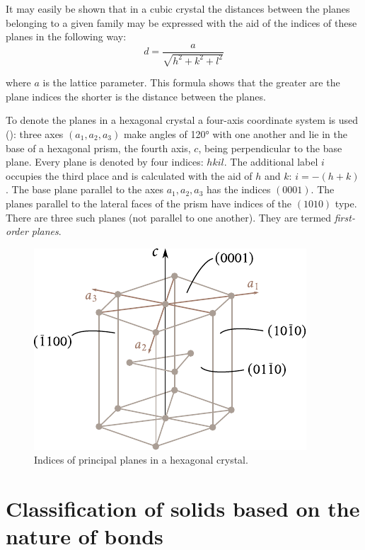 It may easily be shown that in a cubic crystal the distances between the planes belonging to a given family may be expressed with the aid of the indices of these planes in the following way:
\begin{equation}\label{eq:1_17}
	d = \frac{a}{\sqrt{h^2 + k^2 + l^2}}
\end{equation}

\noindent
where $a$ is the lattice parameter. This formula shows that the greater are the plane indices the shorter is the distance between the planes.

To denote the planes in a hexagonal crystal a four-axis coordinate system is used (): three axes $(a_1, a_2, a_3)$ make angles of \ang{120} with one another and lie in the base of a hexagonal prism, the fourth axis, $c$, being perpendicular to the base plane. Every plane is denoted by four indices: $hkil$. The additional label $i$ occupies the third place and is calculated with the aid of $h$ and $k$: $i=-(h+k)$. The base plane parallel to the axes $a_1, a_2, a_3$ has the indices $(0001)$. The planes parallel to the lateral faces of the prism have indices of the $(1010)$ type. There are three such planes (not parallel to one another). They are termed \textit{first-order planes}.

\begin{figure}[t]
	\begin{center}
		\includegraphics[scale=1.0]{figures/ch_01/fig_1_18.pdf}
		\caption[]{Indices of principal planes in a hexagonal crystal.}
		\label{fig:1_18}
	\end{center}
	\vspace{-0.7cm}
\end{figure}

\section{Classification of solids based on the nature of bonds}\label{sec:1_10}

